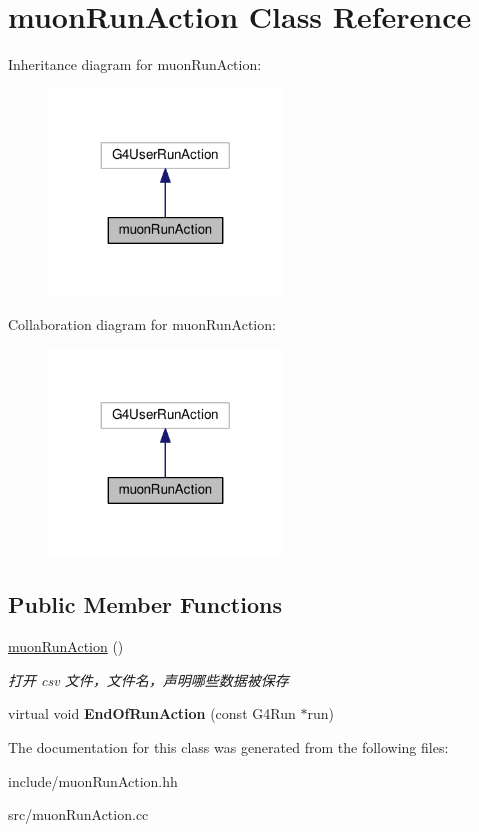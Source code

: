 \hypertarget{classmuonRunAction}{}\section{muon\+Run\+Action Class Reference}
\label{classmuonRunAction}


Inheritance diagram for muon\+Run\+Action\+:\nopagebreak
\begin{figure}[H]
\begin{center}
\leavevmode
\includegraphics[width=176pt]{classmuonRunAction__inherit__graph}
\end{center}
\end{figure}


Collaboration diagram for muon\+Run\+Action\+:\nopagebreak
\begin{figure}[H]
\begin{center}
\leavevmode
\includegraphics[width=176pt]{classmuonRunAction__coll__graph}
\end{center}
\end{figure}
\subsection*{Public Member Functions}
\begin{DoxyCompactItemize}
\item 
\mbox{\label{classmuonRunAction_af8ea0396dde7e9a638382c7134173929}} 
\hyperlink{classmuonRunAction_af8ea0396dde7e9a638382c7134173929}{muon\+Run\+Action} ()
\begin{DoxyCompactList}\small\item\em 打开 csv 文件，文件名，声明哪些数据被保存 \end{DoxyCompactList}\item 
\mbox{\label{classmuonRunAction_aa2956c94bf9f6d3c93ac25182dd6a3ba}} 
virtual void {\bfseries End\+Of\+Run\+Action} (const G4\+Run $\ast$run)
\end{DoxyCompactItemize}


The documentation for this class was generated from the following files\+:\begin{DoxyCompactItemize}
\item 
include/muon\+Run\+Action.\+hh\item 
src/muon\+Run\+Action.\+cc\end{DoxyCompactItemize}

